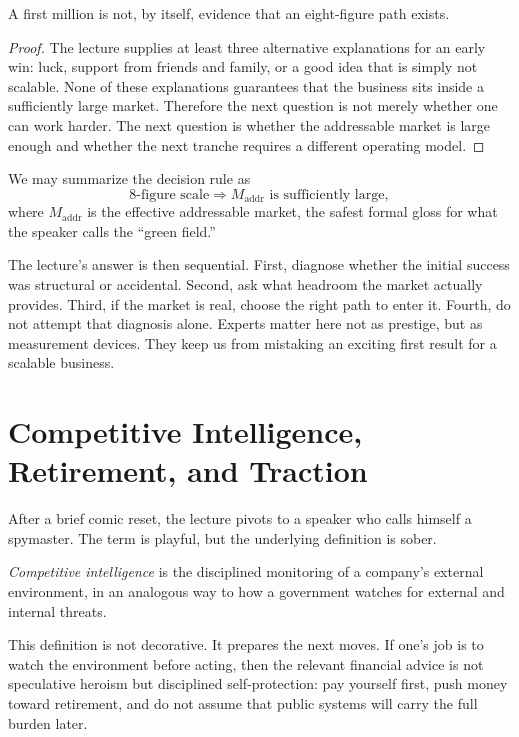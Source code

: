 \begin{proposition}
A first million is not, by itself, evidence that an eight-figure path exists.
\end{proposition}

\begin{proof}
The lecture supplies at least three alternative explanations for an early win: luck, support from friends and family, or a good idea that is simply not scalable. None of these explanations guarantees that the business sits inside a sufficiently large market. Therefore the next question is not merely whether one can work harder. The next question is whether the addressable market is large enough and whether the next tranche requires a different operating model.
\end{proof}

We may summarize the decision rule as
\begin{equation}
\text{8-figure scale} \Rightarrow M_{\mathrm{addr}} \text{ is sufficiently large},
\end{equation}
where $M_{\mathrm{addr}}$ is the effective addressable market, the safest formal gloss for what the speaker calls the ``green field.''

The lecture's answer is then sequential. First, diagnose whether the initial success was structural or accidental. Second, ask what headroom the market actually provides. Third, if the market is real, choose the right path to enter it. Fourth, do not attempt that diagnosis alone. Experts matter here not as prestige, but as measurement devices. They keep us from mistaking an exciting first result for a scalable business.

\section{Competitive Intelligence, Retirement, and Traction}

After a brief comic reset, the lecture pivots to a speaker who calls himself a spymaster. The term is playful, but the underlying definition is sober.

\begin{definition}
\emph{Competitive intelligence} is the disciplined monitoring of a company's external environment, in an analogous way to how a government watches for external and internal threats.
\end{definition}

This definition is not decorative. It prepares the next moves. If one's job is to watch the environment before acting, then the relevant financial advice is not speculative heroism but disciplined self-protection: pay yourself first, push money toward retirement, and do not assume that public systems will carry the full burden later.

